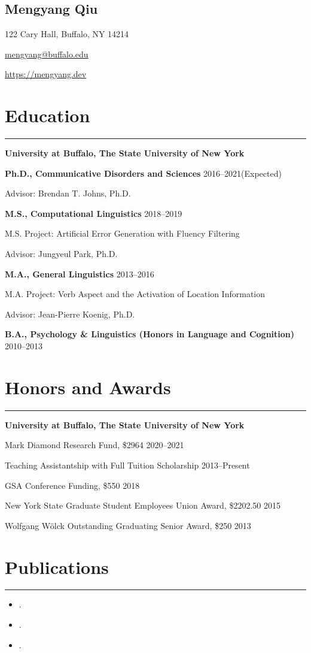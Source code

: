 \documentclass[11pt]{article}
\newcommand{\name}[1]{\begin{center}\section*{\Huge #1}\end{center}}
\newcommand{\topinfo}[1]{\begin{center}\vspace{-0.2cm}#1\vspace{-0.2cm}\end{center}}
\newcommand{\cvsection}[1]{\vspace{-0.2cm}\section*{\Large #1}\vspace{-0.2cm}\hrule\vspace{0.2cm}}
\begin{document}
\name{Mengyang Qiu}
\topinfo{122 Cary Hall, Buffalo, NY 14214}
\topinfo{\href{mailto:mengyang@buffalo.edu}{mengyang@buffalo.edu}}
\topinfo{\url{https://mengyang.dev}}


\cvsection{Education}

\textbf{University at Buffalo, The State University of New York}

\textbf{Ph.D., Communicative Disorders and Sciences} \hfill 2016--2021(Expected)

\quad Advisor: Brendan T. Johns, Ph.D.

\textbf{M.S., Computational Linguistics} \hfill 2018--2019

\quad M.S. Project: Artificial Error Generation with Fluency Filtering

\quad Advisor: Jungyeul Park, Ph.D.

\textbf{M.A., General Linguistics} \hfill 2013--2016

\quad M.A. Project: Verb Aspect and the Activation of Location Information

\quad Advisor: Jean-Pierre Koenig, Ph.D.

\textbf{B.A., Psychology \& Linguistics (Honors in Language and Cognition)} \hfill 2010--2013


\cvsection{Honors and Awards}

\textbf{University at Buffalo, The State University of New York}

Mark Diamond Research Fund, \$2964 \hfill 2020--2021

Teaching Assistantship with Full Tuition Scholarship \hfill 2013--Present

GSA Conference Funding, \$550 \hfill 2018

New York State Graduate Student Employees Union Award, \$2202.50 \hfill 2015

Wolfgang W{\"o}lck Outstanding Graduating Senior Award, \$250 \hfill 2013


\cvsection{Publications}

\begin{itemize}[leftmargin=!,labelindent=!,itemindent=-15pt]
    \setlength\itemsep{0.3em}

    \item[] .
    \item[] .
    \item[] .

\end{itemize}
\end{document}
